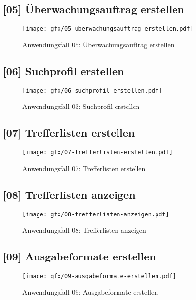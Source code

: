 \subsection{[05] Überwachungsauftrag erstellen}

\begin{figure}[H]
  \texttt{[image: gfx/05-uberwachungsauftrag-erstellen.pdf]}
  \caption{Anwendungsfall 05: Überwachungsauftrag erstellen}
  \label{fig:AF05}
\end{figure}

\subsection{[06] Suchprofil erstellen}

\begin{figure}[H]
  \texttt{[image: gfx/06-suchprofil-erstellen.pdf]}
  \caption{Anwendungsfall 03: Suchprofil erstellen}
  \label{fig:AF06}
\end{figure}

\subsection{[07] Trefferlisten erstellen}

\begin{figure}[H]
  \texttt{[image: gfx/07-trefferlisten-erstellen.pdf]}
  \caption{Anwendungsfall 07: Trefferlisten erstellen}
  \label{fig:AF07}
\end{figure}

\subsection{[08] Trefferlisten anzeigen}

\begin{figure}[H]
  \texttt{[image: gfx/08-trefferlisten-anzeigen.pdf]}
  \caption{Anwendungsfall 08: Trefferlisten anzeigen}
  \label{fig:AF08}
\end{figure}

\subsection{[09] Ausgabeformate erstellen}

\begin{figure}[H]
  \texttt{[image: gfx/09-ausgabeformate-erstellen.pdf]}
  \caption{Anwendungsfall 09: Ausgabeformate erstellen}
  \label{fig:AF09}
\end{figure}

